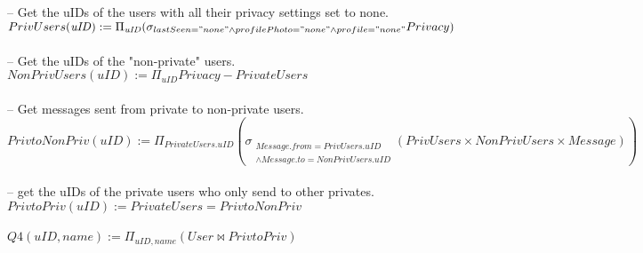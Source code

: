 \documentclass{article}
\newcommand{\var}[1]{\mathit{#1}}
\begin{document}
\begin{enumerate}
{\large
\hspace*{1cm} -- Get the uIDs of the users with all their privacy settings set to none. \\ [5pt]
$
PrivUsers(\var{uID}) := 
	\Pi_{\var{uID}}
	(\sigma_{lastSeen = "none" \\
			\wedge profilePhoto = "none" \\
			\wedge profile = "none"} Privacy)
$ \\\\
\hspace*{1cm} -- Get the uIDs of the "non-private" users. \\ [5pt]
$
NonPrivUsers(\var{uID}) :=
	\Pi_{\var{uID}} Privacy - PrivateUsers
$ \\\\
\hspace*{1cm} -- Get messages sent from private to non-private users.	 \\ [5pt]
$
PrivtoNonPriv(\var{uID}) :=
	\Pi_{\var{PrivateUsers.uID}}
	(\sigma_{\substack{Message.from = PrivUsers.uID \\
		 \wedge Message.to = NonPrivUsers.uID}}
		(PrivUsers \times NonPrivUsers \times Message))	
$ \\	\\
\hspace*{1cm} -- get the uIDs of the private users who only send to other privates. \\ [5pt]
$
PrivtoPriv(\var{uID}) :=
	PrivateUsers = PrivtoNonPriv
$ \\\\
$
Q4(\var{uID}, name) :=
	\Pi_{\var{uID}, \var{name}} (User \bowtie PrivtoPriv)
$


}


\end{enumerate}
\end{document}

